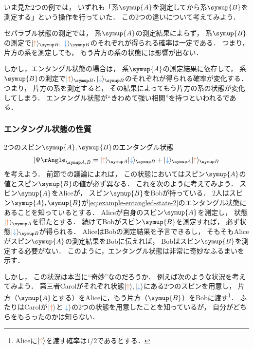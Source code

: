 \documentclass[
]{sotsu}
\newcommand{\bitone}{\mathcolor{fire}{\uparrow}}
\newcommand{\bittwo}{\mathcolor{water}{\downarrow}}
\begin{document}
\quad 
いま見た2つの例では，
いずれも「系$\symup{A}$を測定してから系$\symup{B}$を測定する」という操作を行っていた．
この2つの違いについて考えてみよう．

セパラブル状態の測定では，
系$\symup{A}$の測定結果によらず，
系$\symup{B}$の測定で$\ket{\bitone}<B>, \ket{\bittwo}<B>$のそれぞれが得られる確率は一定である．
つまり，
片方の系を測定しても，
もう片方の系の状態には影響が出ない．

しかし，エンタングル状態の場合は，
系$\symup{A}$の測定結果に依存して，
系$\symup{B}$の測定で$\ket{\bitone}<B>, \ket{\bittwo}<B>$のそれぞれが得られる確率が変化する．
つまり，
片方の系を測定すると，
その結果によってもう片方の系の状態が変化してしまう．
エンタングル状態が``きわめて強い相関''を持つといわれるである．





\subsubsection{エンタングル状態の性質}

2つのスピン$\symup{A}, \symup{B}$のエンタングル状態
\begin{equation}
    \label{eq:example-entangled-state-2}
    \Ket{\Psi}<A,B> = \ket{\bitone}<A> \ket{\bittwo}<B> + \ket{\bittwo}<A> \ket{\bitone}<B>
\end{equation}
を考えよう．
前節での議論によれば，
この状態においてはスピン$\symup{A}$の値とスピン$\symup{B}$の値が必ず異なる．
これを次のように考えてみよう．
スピン$\symup{A}$をAliceが，
スピン$\symup{B}$をBobが持っている．
2人はスピン$\symup{A}, \symup{B}$が\cref{eq:example-entangled-state-2}のエンタングル状態にあることを知っているとする．
Aliceが自身のスピン$\symup{A}$を測定し，
状態$\ket{\bitone}<A>$を得たとする．
続けてBobがスピン$\symup{B}$を測定すれば，
必ず状態$\ket{\bittwo}<B>$が得られる．
AliceはBobの測定結果を予言できるし，
そもそもAliceがスピン$\symup{A}$の測定結果をBobに伝えれば，
Bobはスピン$\symup{B}$を測定する必要がない．
このように，エンタングル状態は非常に奇妙なふるまいを示す．

しかし，
この状況は本当に``奇妙''なのだろうか．
例えば次のような状況を考えてみよう．
第三者Carolがそれぞれ状態$\ket{\bitone}, \ket{\bittwo}$にある2つのスピンを用意し，
片方（$\symup{A}$とする）をAliceに，もう片方（$\symup{B}$）をBobに渡す\footnote{
    Aliceに$\ket{\bitone}$を渡す確率は$1/2$であるとする．
}．
ふたりはCarolが$\ket{\bitone}$と$\ket{\bittwo}$の2つの状態を用意したことを知っているが，
自分がどちらをもらったのかは知らない．
\end{document}
